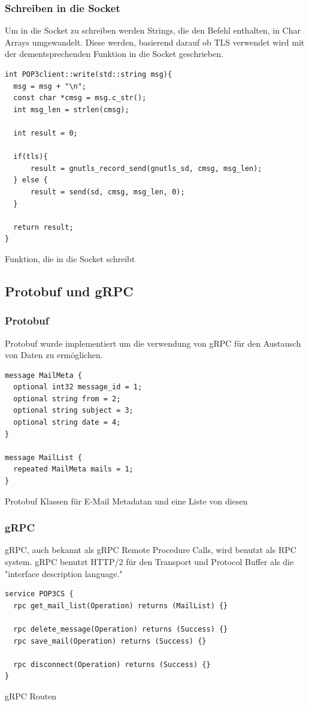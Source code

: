 \documentclass[12pt, letterpaper]{article}
\newenvironment{code}{\captionsetup{type=listing}}{}
\begin{document}
\subsubsection{Schreiben in die Socket}

Um in die Socket zu schreiben werden Strings, die den Befehl enthalten, in Char Arrays umgewandelt. Diese werden, basierend darauf ob TLS verwendet wird mit der dementsprechenden Funktion in die Socket geschrieben.

\begin{code}
\begin{verbatim}
int POP3client::write(std::string msg){
  msg = msg + "\n";
  const char *cmsg = msg.c_str();
  int msg_len = strlen(cmsg);

  int result = 0;

  if(tls){
      result = gnutls_record_send(gnutls_sd, cmsg, msg_len);
  } else {
      result = send(sd, cmsg, msg_len, 0);
  }

  return result;
}
\end{verbatim}
\caption{Funktion, die in die Socket schreibt}
\label{write_in_socket}
\end{code}

\subsection{Protobuf und gRPC}
\subsubsection{Protobuf}
Protobuf\cite{protobuf} wurde implementiert um die verwendung von gRPC für den Austausch von Daten zu ermöglichen.
\begin{code}
  \begin{verbatim}
message MailMeta {
  optional int32 message_id = 1;
  optional string from = 2;
  optional string subject = 3;
  optional string date = 4;
}

message MailList {
  repeated MailMeta mails = 1;
}
  \end{verbatim}
  \caption{Protobuf Klassen für E-Mail Metadatan und eine Liste von diesen}
  \label{proto}
\end{code}

\subsubsection{gRPC}

gRPC\cite{grpc}, auch bekannt als gRPC Remote Procedure Calls, wird benutzt als RPC system. gRPC benutzt HTTP/2 für den Transport und Protocol Buffer als die "interface description language."
\begin{code}
  \begin{verbatim}
service POP3CS {
  rpc get_mail_list(Operation) returns (MailList) {}

  rpc delete_message(Operation) returns (Success) {}
  rpc save_mail(Operation) returns (Success) {}

  rpc disconnect(Operation) returns (Success) {}
}
  \end{verbatim}
  \caption{gRPC Routen}
  \label{grpc}
\end{code}
\end{document}
